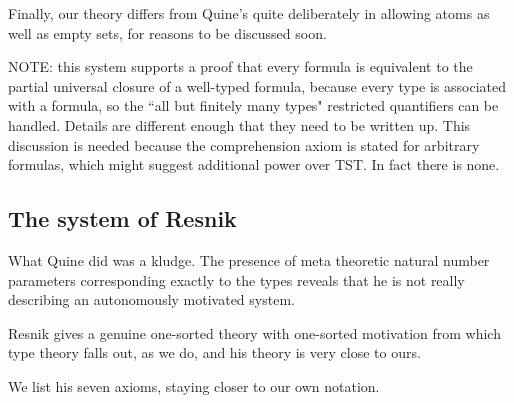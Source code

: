 \documentclass[12pt]{article}
\begin{document}
Finally, our theory differs from Quine's quite deliberately in allowing atoms as well as empty sets, for reasons to be discussed soon.

NOTE:  this system supports a proof that every formula is equivalent to the partial universal closure of a well-typed formula, because every type is associated with a formula, so the ``all but finitely many types" restricted quantifiers can be handled.  Details are different enough that they need to be written up.  This discussion is needed because the comprehension axiom is stated for arbitrary formulas, which might suggest additional power over TST.  In fact there is none.


\subsection{The system of Resnik}

What Quine did was a kludge.  The presence of meta theoretic natural number parameters corresponding exactly to the types
reveals that he is not really describing an autonomously motivated system.

Resnik gives a genuine one-sorted theory with one-sorted motivation from which type theory falls out, as we do, and his theory is very close to ours.

We list his seven axioms, staying closer to our own notation.
\end{document}
